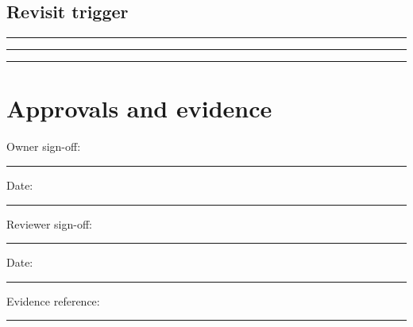 \documentclass[11pt]{article}
\begin{document}
\subsection{Revisit trigger}
\noindent\rule{\linewidth}{0.3pt}\par\vspace{0.18in}
\noindent\rule{\linewidth}{0.3pt}\par\vspace{0.18in}
\noindent\rule{\linewidth}{0.3pt}\par\vspace{0.14in}

\section{Approvals and evidence}
\noindent Owner sign-off: \rule{0.42\linewidth}{0.4pt}\hfill Date: \rule{0.19\linewidth}{0.4pt}\par\vspace{0.4cm}
\noindent Reviewer sign-off: \rule{0.40\linewidth}{0.4pt}\hfill Date: \rule{0.19\linewidth}{0.4pt}\par\vspace{0.4cm}
\noindent Evidence reference: \rule{0.70\linewidth}{0.4pt}
\end{document}

